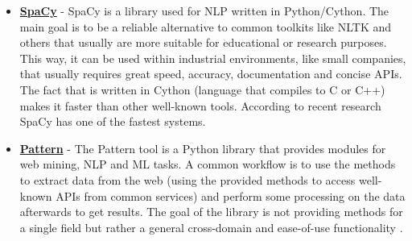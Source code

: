 \begin{itemize}
    \item \textbf{\href{https://spacy.io}{SpaCy}} - SpaCy is a library used for NLP written in Python/Cython. The main goal is to be a reliable alternative to common toolkits like NLTK and others that usually are more suitable for educational or research purposes. This way, it can be used within industrial environments, like small companies, that usually requires great speed, accuracy, documentation and concise APIs. The fact that is written in Cython (language that compiles to C or C++) makes it faster than other well-known tools. According to recent research SpaCy has one of the fastest systems\citep{honnibal2015spacy,Choi2015DependencyParserComparison}.%
    
    \item \textbf{\href{http://www.clips.ua.ac.be/pages/pattern}{Pattern}} - The Pattern tool is a Python library that provides modules for web mining, NLP and ML tasks. A common workflow is to use the methods to extract data from the web (using the provided methods to access well-known APIs from common services) and perform some processing on the data afterwards to get results. The goal of the library is not providing methods for a single field but rather a general cross-domain and ease-of-use functionality \citep{Smedt2012Pattern}.
    

\end{itemize}
